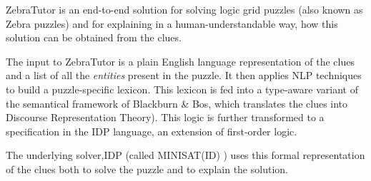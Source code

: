 ZebraTutor is an end-to-end solution for solving logic grid puzzles (also known as Zebra puzzles) and for explaining in a human-understandable way, how this solution can be obtained from the clues. 

The input to ZebraTutor is a plain English language representation of the clues and a list of all the \textit{entities} present in the puzzle. It then applies NLP techniques to build a puzzle-specific lexicon. This lexicon is fed into a type-aware variant of the semantical framework of Blackburn \& Bos, which translates the clues into Discourse Representation Theory). This logic is further transformed to a specification in the IDP language, an extension of first-order logic. 

The underlying solver,IDP (called
 MINISAT(ID) ) uses this formal representation of the clues both to  solve the puzzle and to explain the solution. 
 
